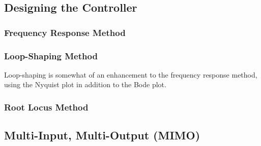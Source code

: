 \documentclass[../notes.tex]{subfiles}
\begin{document}
\subsection{Designing the Controller}
\subsubsection{Frequency Response Method}
\subsubsection{Loop-Shaping Method}
Loop-shaping is somewhat of an enhancement to the frequency response method, using the Nyquist plot in addition to the Bode plot.
\subsubsection{Root Locus Method}
\subsection{Multi-Input, Multi-Output (MIMO)}
\end{document}
